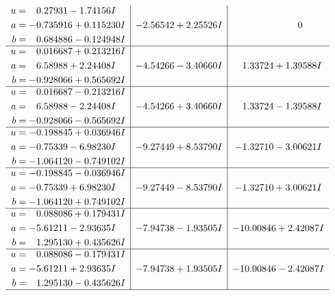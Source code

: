 \documentclass[1p]{elsarticle_modified}
\theoremstyle{definition}
\begin{document}
$$\begin{array}{c|c|c}
\begin{aligned}
u &= \phantom{-}0.27931 - 1.74156 I \\
a &= -0.735916 + 0.115230 I \\
b &= \phantom{-}0.684886 - 0.124948 I\end{aligned}
 & -2.56542 + 2.25526 I & \phantom{-0.000000 } 0 \\ \hline\begin{aligned}
u &= \phantom{-}0.016687 + 0.213216 I \\
a &= \phantom{-}6.58988 + 2.24408 I \\
b &= -0.928066 + 0.565692 I\end{aligned}
 & -4.54266 - 3.40660 I & \phantom{-}1.33724 + 1.39588 I \\ \hline\begin{aligned}
u &= \phantom{-}0.016687 - 0.213216 I \\
a &= \phantom{-}6.58988 - 2.24408 I \\
b &= -0.928066 - 0.565692 I\end{aligned}
 & -4.54266 + 3.40660 I & \phantom{-}1.33724 - 1.39588 I \\ \hline\begin{aligned}
u &= -0.198845 + 0.036946 I \\
a &= -0.75339 - 6.98230 I \\
b &= -1.064120 - 0.749102 I\end{aligned}
 & -9.27449 + 8.53790 I & -1.32710 - 3.00621 I \\ \hline\begin{aligned}
u &= -0.198845 - 0.036946 I \\
a &= -0.75339 + 6.98230 I \\
b &= -1.064120 + 0.749102 I\end{aligned}
 & -9.27449 - 8.53790 I & -1.32710 + 3.00621 I \\ \hline\begin{aligned}
u &= \phantom{-}0.088086 + 0.179431 I \\
a &= -5.61211 - 2.93635 I \\
b &= \phantom{-}1.295130 + 0.435626 I\end{aligned}
 & -7.94738 - 1.93505 I & -10.00846 + 2.42087 I \\ \hline\begin{aligned}
u &= \phantom{-}0.088086 - 0.179431 I \\
a &= -5.61211 + 2.93635 I \\
b &= \phantom{-}1.295130 - 0.435626 I\end{aligned}
 & -7.94738 + 1.93505 I & -10.00846 - 2.42087 I\\
 \hline 
 \end{array}$$\newpage\newpage\renewcommand{\arraystretch}{1}
\end{document}
